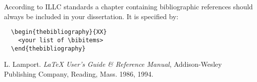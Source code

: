 \begin{thebibliography}{XX}
According to ILLC standards a chapter containing bibliographic
references should always be included in your dissertation.
It is specified by:
\begin{verbatim}
  \begin{thebibliography}{XX}
    <your list of \bibitems>
  \end{thebibliography}
\end{verbatim}
L. Lamport. {\em \LaTeX{} User's Guide \& Reference
Manual\/}, Addison-Wesley Publishing Company, Reading, Mass. 1986, 1994.
\end{thebibliography}


